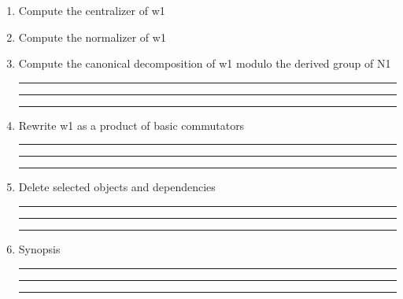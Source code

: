 \begin{enumerate}
\item Compute the centralizer of w1

\item Compute the normalizer of w1

\item Compute the canonical decomposition of w1 modulo the derived
group of N1

\bigskip
\hrule\hrule\hrule

\item Rewrite w1 as a product of basic commutators

\bigskip
\hrule\hrule\hrule

\item Delete selected objects and dependencies

\bigskip
\hrule\hrule\hrule

\item
Synopsis

\bigskip
\hrule\hrule\hrule

\end{enumerate}
